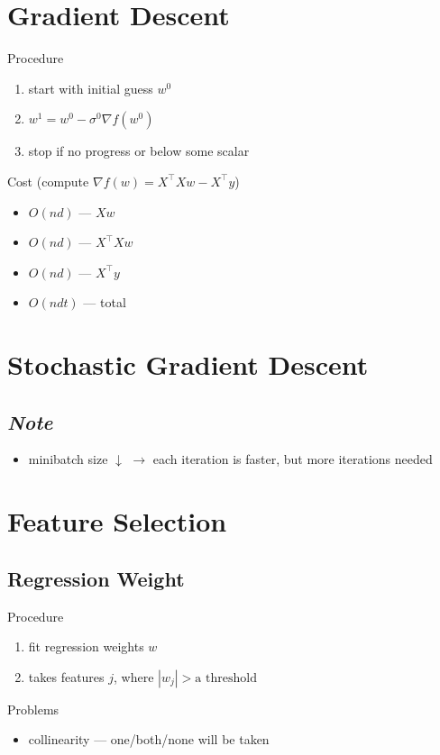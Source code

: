 \documentclass[10pt,landscape,a4paper]{article}
\begin{document}
\begin{multicols*}{5}
\section{Gradient Descent}
Procedure
\begin{enumerate}
    \item start with initial guess \(w^0\)
    \item \(w^1 = w^0 - \sigma^0 \nabla f(w^0)\)
    \item stop if no progress or below some scalar
\end{enumerate}
Cost (compute \(\nabla f(w) = X^\intercal Xw - X^\intercal y\))
\begin{itemize}
    \item \(O(nd)\) --- \(Xw\)
    \item \(O(nd)\) --- \(X^\intercal Xw\)
    \item \(O(nd)\) --- \(X^\intercal y\)
    \item \(O(ndt)\) --- total
\end{itemize}

\section{Stochastic Gradient Descent}

\subsection{\emph{Note}}
\begin{itemize}
    \item minibatch size \(\downarrow \) \(\rightarrow \) each iteration is faster, but more iterations needed
\end{itemize}

\section{Feature Selection}

\subsection{Regression Weight}
Procedure
\begin{enumerate}
    \item fit regression weights \(w\)
    \item takes features \(j\), where \(|w_j| > \text{a threshold }\)
\end{enumerate}
Problems
\begin{itemize}
    \item collinearity --- one/both/none will be taken
\end{itemize}


\end{multicols*}
\end{document}
